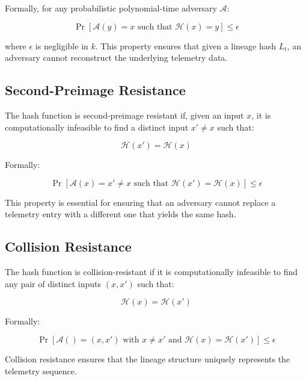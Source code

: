 Formally, for any probabilistic polynomial-time adversary $\mathcal{A}$:

\begin{equation}
\Pr[\mathcal{A}(y) = x \text{ such that } \mathcal{H}(x) = y] \leq \epsilon
\end{equation}

where $\epsilon$ is negligible in $k$. This property ensures that given a lineage hash $L_t$, an adversary cannot reconstruct the underlying telemetry data.

\subsection{Second-Preimage Resistance}

The hash function is second-preimage resistant if, given an input $x$, it is computationally infeasible to find a distinct input $x' \neq x$ such that:

\begin{equation}
\mathcal{H}(x') = \mathcal{H}(x)
\end{equation}

Formally:

\begin{equation}
\Pr[\mathcal{A}(x) = x' \neq x \text{ such that } \mathcal{H}(x') = \mathcal{H}(x)] \leq \epsilon
\end{equation}

This property is essential for ensuring that an adversary cannot replace a telemetry entry with a different one that yields the same hash.

\subsection{Collision Resistance}

The hash function is collision-resistant if it is computationally infeasible to find any pair of distinct inputs $(x, x')$ such that:

\begin{equation}
\mathcal{H}(x) = \mathcal{H}(x')
\end{equation}

Formally:

\begin{equation}
\Pr[\mathcal{A}() = (x, x') \text{ with } x \neq x' \text{ and } \mathcal{H}(x) = \mathcal{H}(x')] \leq \epsilon
\end{equation}

Collision resistance ensures that the lineage structure uniquely represents the telemetry sequence.

